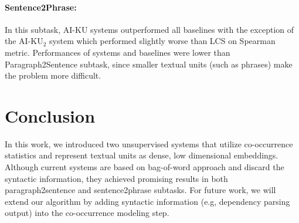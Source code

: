 \documentclass[11pt]{article}
\begin{document}
\paragraph{Sentence2Phrase:} In this subtask, AI-KU systems outperformed all baselines with the exception of the AI-KU$_2$ system which performed slightly worse than LCS on Spearman metric. Performances of systems and baselines were lower than Paragraph2Sentence subtask, since smaller textual units (such as phrases) make the problem more difficult.

\section{Conclusion}
\label{conclusion}

In this work, we introduced two unsupervised systems that utilize co-occurrence statistics and represent textual units as dense, low dimensional embeddings. 
Although current systems are based on bag-of-word approach and discard the syntactic information, they achieved promising results in both paragraph2sentence and sentence2phrase subtasks. For future work, we will extend our algorithm by adding syntactic information (e.g, dependency parsing output) into the co-occurrence modeling step.



% 




\end{document}
